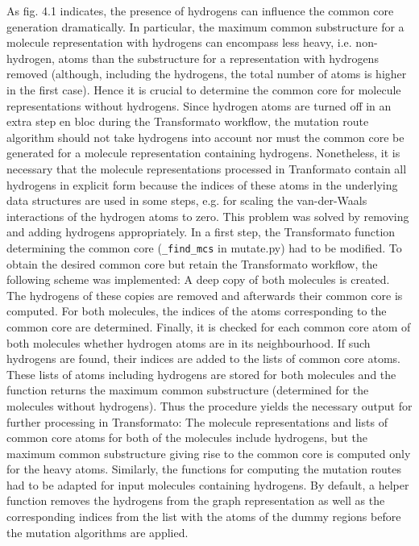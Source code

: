 As fig. 4.1 indicates, the presence of hydrogens can influence the common core generation dramatically. In particular, the maximum common substructure for a molecule representation with hydrogens can encompass less heavy, i.e. non-hydrogen, atoms than the substructure for a representation with hydrogens removed (although, including the hydrogens, the total number of atoms is higher in the first case). Hence it is crucial to determine the common core for molecule representations without hydrogens. Since hydrogen atoms are turned off in an extra step en bloc during the Transformato workflow, the mutation route algorithm should not take hydrogens into account nor must the common core be generated for a molecule representation containing hydrogens.
Nonetheless, it is necessary that the molecule representations processed in Tranformato contain all hydrogens in explicit form because the indices of these atoms in the underlying data structures are used in some steps, e.g. for scaling the van-der-Waals interactions of the hydrogen atoms to zero.
This problem was solved by removing and adding hydrogens appropriately.
In a first step, the Transformato function determining the common core (\texttt{\_find\_mcs} in mutate.py) had to be modified. To obtain the desired common core but retain the Transformato workflow, the following scheme was implemented:
A deep copy of both molecules is created. The hydrogens of these copies are removed and afterwards their common core is computed. For both molecules, the indices of the atoms corresponding to the common core are determined. Finally, it is checked for each common core atom of both molecules whether hydrogen atoms are in its neighbourhood. If such hydrogens are found, their indices are added to the lists of common core atoms. These lists of atoms including hydrogens are stored for both molecules and the function returns the maximum common substructure (determined for the molecules without hydrogens).
Thus the procedure yields the necessary output for further processing in Transformato: The molecule representations and lists of common core atoms for both of the molecules include hydrogens, but the maximum common substructure giving rise to the common core is computed only for the heavy atoms.
Similarly, the functions for computing the mutation routes had to be adapted for input molecules containing hydrogens. By default, a helper function removes the hydrogens from the graph representation as well as the corresponding indices from the list with the atoms of the dummy regions before the mutation algorithms are applied. 




